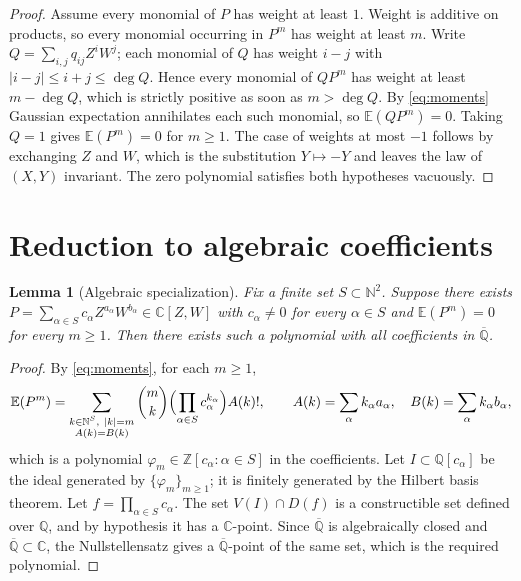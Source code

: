 \documentclass[11pt]{amsart}
\theoremstyle{plain}
\newtheorem{lemma}[theorem]{Lemma}
\theoremstyle{remark}
\numberwithin{equation}{section}
\newcommand{\C}{\mathbb{C}}
\newcommand{\Q}{\mathbb{Q}}
\newcommand{\Z}{\mathbb{Z}}
\newcommand{\N}{\mathbb{N}}
\newcommand{\E}{\mathbb{E}}
\newcommand{\Qbar}{\overline{\Q}}
\begin{document}
\begin{proof}
Assume every monomial of $P$ has weight at least $1$. Weight is additive on
products, so every monomial occurring in $P^m$ has weight at least $m$. Write
$Q=\sum_{i,j}q_{ij}Z^iW^j$; each monomial of $Q$ has weight $i-j$ with
$|i-j|\le i+j\le\deg Q$. Hence every monomial of $QP^m$ has weight at least
$m-\deg Q$, which is strictly positive as soon as $m>\deg Q$. By
\eqref{eq:moments} Gaussian expectation annihilates each such monomial, so
$\E(QP^m)=0$. Taking $Q=1$ gives $\E(P^m)=0$ for $m\ge1$. The case of weights at
most $-1$ follows by exchanging $Z$ and $W$, which is the substitution
$Y\mapsto-Y$ and leaves the law of $(X,Y)$ invariant. The zero polynomial
satisfies both hypotheses vacuously.
\end{proof}

\section{Reduction to algebraic coefficients}\label{sec:spec}

\begin{lemma}[Algebraic specialization]\label{lem:spec}
Fix a finite set $S\subset\N^2$. Suppose there exists
$P=\sum_{\alpha\in S}c_\alpha Z^{a_\alpha}W^{b_\alpha}\in\C[Z,W]$ with
$c_\alpha\ne0$ for every $\alpha\in S$ and $\E(P^m)=0$ for every $m\ge1$. Then
there exists such a polynomial with all coefficients in $\Qbar$.
\end{lemma}

\begin{proof}
By \eqref{eq:moments}, for each $m\ge1$,
\begin{equation}\label{eq:momentexp}
  \E(P^m)=\sum_{\substack{k\in\N^{S},\ |k|=m\\ A(k)=B(k)}}
  \binom{m}{k}\Bigl(\prod_{\alpha\in S}c_\alpha^{k_\alpha}\Bigr)A(k)!,
  \qquad
  A(k)=\sum_\alpha k_\alpha a_\alpha,\quad B(k)=\sum_\alpha k_\alpha b_\alpha,
\end{equation}
which is a polynomial $\varphi_m\in\Z[c_\alpha:\alpha\in S]$ in the
coefficients. Let $I\subset\Q[c_\alpha]$ be the ideal generated by
$\{\varphi_m\}_{m\ge1}$; it is finitely generated by the Hilbert basis theorem.
Let $f=\prod_{\alpha\in S}c_\alpha$. The set
$V(I)\cap D(f)$ is a constructible set defined over $\Q$, and by hypothesis it
has a $\C$-point. Since $\Qbar$ is algebraically closed and
$\Qbar\subset\C$, the Nullstellensatz gives a $\Qbar$-point of the same set,
which is the required polynomial.
\end{proof}
\end{document}
